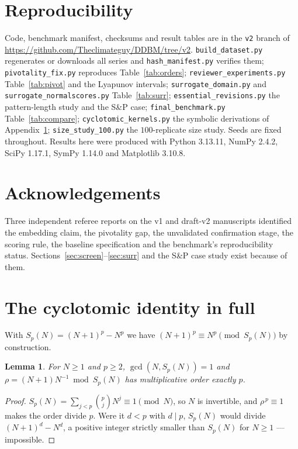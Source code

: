 \documentclass[11pt]{article}
\newtheorem{lemma}{Lemma}
\begin{document}
\section*{Reproducibility}

Code, benchmark manifest, checksums and result tables are in the \texttt{v2}
branch of \url{https://github.com/Theclimateguy/DDBM/tree/v2}.
\texttt{build\_dataset.py} regenerates or downloads all series and
\texttt{hash\_manifest.py} verifies them; \texttt{pivotality\_fix.py} reproduces
Table~\ref{tab:orders}; \texttt{reviewer\_experiments.py} Table~\ref{tab:pivot}
and the Lyapunov intervals; \texttt{surrogate\_domain.py} and
\texttt{surrogate\_normalscores.py} Table~\ref{tab:surr};
\texttt{essential\_revisions.py} the pattern-length study and the S\&P case;
\texttt{final\_benchmark.py} Table~\ref{tab:compare};
\texttt{cyclotomic\_kernels.py} the symbolic derivations of
Appendix~\ref{app:cyclo}; \texttt{size\_study\_100.py} the $100$-replicate size
study. Seeds are fixed throughout. Results here were produced with Python
3.13.11, NumPy 2.4.2, SciPy 1.17.1, SymPy 1.14.0 and Matplotlib 3.10.8.

\section*{Acknowledgements}

Three independent referee reports on the v1 and draft-v2 manuscripts identified
the embedding claim, the pivotality gap, the unvalidated confirmation stage, the
scoring rule, the baseline specification and the benchmark's reproducibility
status. Sections~\ref{sec:screen}--\ref{sec:surr} and the S\&P case study exist
because of them.


\appendix

\section{The cyclotomic identity in full}
\label{app:cyclo}

With $S_p(N)=(N+1)^p-N^p$ we have $(N+1)^p\equiv N^p \pmod{S_p(N)}$ by
construction.

\begin{lemma}
\label{lem:order}
For $N\ge1$ and $p\ge2$, $\gcd(N,S_p(N))=1$ and
$\rho=(N+1)N^{-1}\bmod S_p(N)$ has multiplicative order exactly $p$.
\end{lemma}

\begin{proof}
$S_p(N)=\sum_{j<p}\binom{p}{j}N^{j}\equiv1\pmod N$, so $N$ is invertible, and
$\rho^{\,p}\equiv1$ makes the order divide $p$. Were it $d<p$ with $d\mid p$,
$S_p(N)$ would divide $(N+1)^d-N^d$, a positive integer strictly smaller than
$S_p(N)$ for $N\ge1$ --- impossible.
\end{proof}
\end{document}
